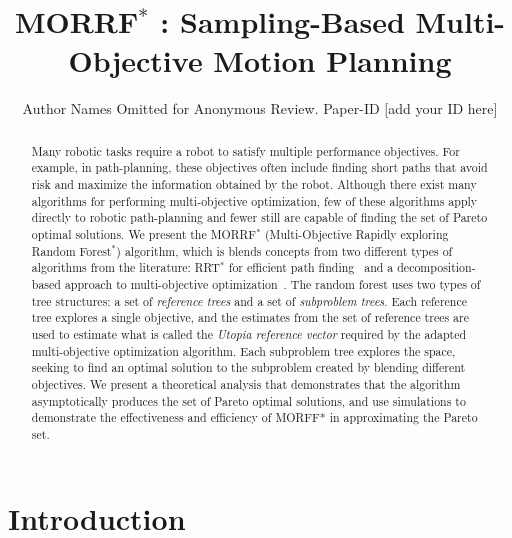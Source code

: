 \documentclass{article}
\title{ MORRF$^{*}$ : Sampling-Based Multi-Objective Motion Planning }
\author{Author Names Omitted for Anonymous Review. Paper-ID [add your ID here]}
\begin{document}
\maketitle

\begin{abstract}
Many robotic tasks require a robot to satisfy multiple performance objectives.  
For example, in path-planning, these objectives often include finding short paths that avoid risk and maximize the information obtained by the robot.  
Although there exist many algorithms for performing multi-objective optimization, few of these algorithms apply directly to robotic path-planning and fewer still are capable of finding the set of Pareto optimal solutions.  
We present the MORRF$^{*}$ (Multi-Objective Rapidly exploring Random Forest$^{*}$) algorithm, which is blends concepts from two different types of algorithms from the literature: RRT$^{*}$ for efficient path finding~\cite{Karaman.Frazzoli:RSS10} and a decomposition-based approach to multi-objective optimization~\cite{4358754}.  
The random forest uses two types of tree structures: a set of {\em reference trees} and a set of {\em subproblem trees}.  
Each reference tree explores a single objective, and the estimates from the set of reference trees are used to estimate what is called the {\em Utopia reference vector} required by the adapted multi-objective optimization algorithm.  
Each subproblem tree explores the space, seeking to find an optimal solution to the subproblem created by blending different objectives.  
We present a theoretical analysis that demonstrates that the algorithm asymptotically produces the set of Pareto optimal solutions, and use simulations to demonstrate the effectiveness and efficiency of MORFF* in approximating the Pareto set.
\end{abstract}

\section{Introduction}
\label{sec:intro}
\end{document}
